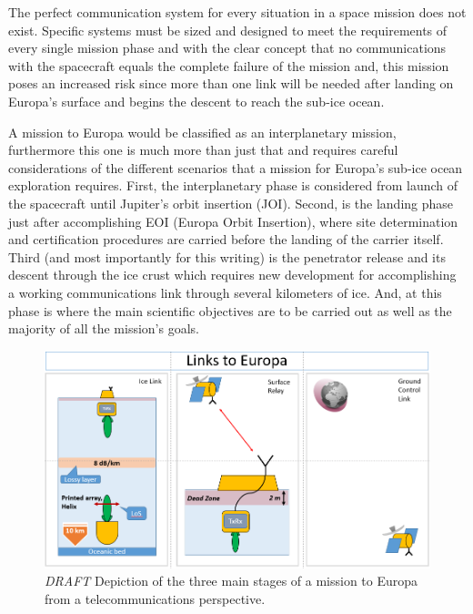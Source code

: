 
The perfect communication system for every situation in a space mission does not exist. Specific systems must be sized and designed to meet the requirements of every single mission phase and with the clear concept that no communications with the spacecraft equals the complete failure of the mission and, this mission poses an increased risk since more than one link will be needed after landing on Europa's surface and begins the descent to reach the sub-ice ocean.

A mission to Europa would be classified as an interplanetary mission, furthermore this one is much more than just that and requires careful considerations of the different scenarios that a mission for Europa's sub-ice ocean exploration requires. First, the interplanetary phase is considered from launch of the spacecraft until Jupiter's orbit insertion (JOI). Second, is the landing phase just after accomplishing EOI (Europa Orbit Insertion), where site determination and certification procedures are carried before the landing of the carrier itself. Third (and most importantly for this writing) is the penetrator release and its descent through the ice crust which requires new development for accomplishing a working communications link through several kilometers of ice. And, at this phase is where the main scientific objectives are to be carried out as well as the majority of all the mission's goals.

\begin{figure}[htb]
	\centering
	\includegraphics[width=\textwidth]{figures/comms/europaLinks}
	\caption{ \textit{DRAFT} Depiction of the three main stages of a mission to Europa from a telecommunications perspective.}
	\label{fig:europaLinks}
\end{figure}

